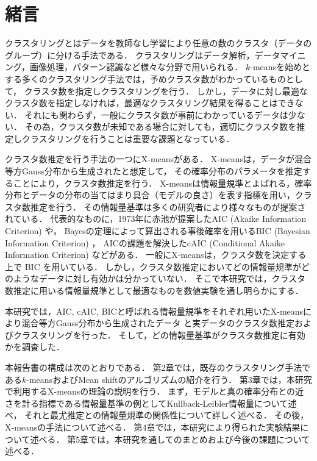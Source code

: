 \section{緒言}
クラスタリングとはデータを教師なし学習により任意の数のクラスタ（データのグループ）に分ける手法である．
クラスタリングはデータ解析，データマイニング，画像処理，パターン認識など様々な分野で用いられる．
$k$-meansを始めとする多くのクラスタリング手法では，予めクラスタ数がわかっているものとして，
クラスタ数を指定しクラスタリングを行う．
しかし，データに対し最適なクラスタ数を指定しなければ，最適なクラスタリング結果を得ることはできない．
それにも関わらず，一般にクラスタ数が事前にわかっているデータは少ない．
その為，クラスタ数が未知である場合に対しても，適切にクラスタ数を推定しクラスタリングを行うことは重要な課題となっている．

クラスタ数推定を行う手法の一つにX-meansがある．
X-meansは，データが混合等方Gauss分布から生成されたと想定して，
その確率分布のパラメータを推定することにより，クラスタ数推定を行う．
X-meansは情報量規準とよばれる，確率分布とデータの分布の当てはまり具合（モデルの良さ）を表す指標を用い，クラスタ数推定を行う．
その情報量基準は多くの研究者により様々なものが提案されている．
代表的なものに，1973年に赤池が提案したAIC (Akaike Information Criterion) や，
Bayesの定理によって算出される事後確率を用いるBIC (Bayesian Information Criterion) ，
AICの課題を解決したcAIC (Conditional Akaike Information Criterion) などがある．
一般にX-meansは，クラスタ数を決定する上で BIC を用いている．
しかし，クラスタ数推定においてどの情報量規準がどのようなデータに対し有効かは分かっていない．
そこで本研究では，クラスタ数推定に用いる情報量規準として最適なものを数値実験を通し明らかにする．

本研究では，AIC, cAIC, BICと呼ばれる情報量規準をそれぞれ用いたX-meansにより混合等方Gauss分布から生成されたデータ
と実データのクラスタ数推定およびクラスタリングを行った．
そして，どの情報量基準がクラスタ数推定に有効かを調査した．

本報告書の構成は次のとおりである．
第2章では，既存のクラスタリング手法である$k$-meansおよびMean shiftのアルゴリズムの紹介を行う．
第3章では，本研究で利用するX-meansの理論の説明を行う．
まず，モデルと真の確率分布との近さを計る指標である情報量基準の例としてKullback-Leibler情報量について述べ，
それと最尤推定との情報量規準の関係性について詳しく述べる．
その後，X-meansの手法について述べる．
第4章では，本研究により得られた実験結果について述べる．
第5章では，本研究を通してのまとめおよび今後の課題について述べる．
